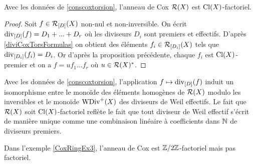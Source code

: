 \begin{thm}
Avec les données de \ref{conscoxtorsion}, l'anneau de Cox $\mathcal{R}(X)$ est $\operatorname{Cl}(X)$-factoriel.
\end{thm}
\begin{proof}
Soit $f\in\mathcal{R}_{[D]}(X)$ non-nul et non-inversible. On écrit $\operatorname{div}_{[D]}(f)=D_1+...+D_r$ où les diviseurs $D_i$ sont premiers et effectifs. D'après \ref{diviCoxTorsFormulas} on obtient des éléments $f_i\in\mathcal{R}_{[D_i]}(X)$ tels que $\operatorname{div}_{[D_i]}(f_i)=D_i$. Or d'après la proposition précédente, chaque $f_i$ est $\operatorname{Cl}(X)$-premier et on a $f=uf_1...f_r$ où $u\in\mathcal{R}(X)^*$.
\end{proof}

\begin{rem}
Avec les données de \ref{conscoxtorsion}, l'application $f\mapsto \operatorname{div}_{[D]}(f)$ induit un isomorphisme entre le monoïde des éléments homogènes de $\mathcal{R}(X)$ modulo les inversibles et le monoïde $\operatorname{WDiv}^+(X)$ des diviseurs de Weil effectifs. Le fait que $\mathcal{R}(X)$ soit $\operatorname{Cl}(X)$-factoriel reflète le fait que tout diviseur de Weil effectif s'écrit de manière unique comme une combinaison linéaire à coefficients dans $\mathbb{N}$ de diviseurs premiers.
\end{rem}

\begin{ex}
Dans l'exemple \ref{CoxRingEx3}, l'anneau de Cox est $\mathbb{Z}/2\mathbb{Z}$-factoriel mais pas factoriel.
\end{ex}

